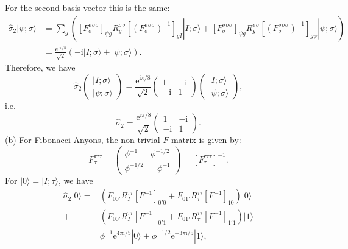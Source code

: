 For the second basis vector this is the same:
\begin{equation*}
\begin{aligned}
\hat{\sigma }_{2} |\psi ;\sigma \rangle  & =\sum _{g} ([F_{\sigma }^{\sigma \sigma \sigma } ]_{\psi g} R_{g}^{\sigma \sigma } [(F_{\sigma }^{\sigma \sigma \sigma } )^{-1} ]_{gI} |I;\sigma \rangle +[F_{\sigma }^{\sigma \sigma \sigma } ]_{\psi g} R_{g}^{\sigma \sigma } [(F_{\sigma }^{\sigma \sigma \sigma } )^{-1} ]_{g\psi } |\psi ;\sigma \rangle )\\
 & =\frac{\mathrm{e}^{\mathrm{i} \pi /8}}{\sqrt{2}} (-\mathrm{i} |I;\sigma \rangle +|\psi ;\sigma \rangle ).
\end{aligned}
\end{equation*}
Therefore, we have
\begin{equation*}
\hat{\sigma }_{2}\begin{pmatrix}
|I;\sigma \rangle \\
|\psi ;\sigma \rangle 
\end{pmatrix} =\frac{\mathrm{e}^{\mathrm{i} \pi /8}}{\sqrt{2}}\begin{pmatrix}
1 & -\mathrm{i}\\
-\mathrm{i} & 1
\end{pmatrix}\begin{pmatrix}
|I;\sigma \rangle \\
|\psi ;\sigma \rangle 
\end{pmatrix} ,
\end{equation*}
i.e.
\begin{equation*}
\hat{\sigma }_{2} =\frac{\mathrm{e}^{\mathrm{i} \pi /8}}{\sqrt{2}}\begin{pmatrix}
1 & -\mathrm{i}\\
-\mathrm{i} & 1
\end{pmatrix} .
\end{equation*}
(b) For Fibonacci Anyons, the non-trivial $F$ matrix is given by:
\begin{equation*}
F_{\tau }^{\tau \tau \tau } =\begin{pmatrix}
\phi ^{-1} & \phi ^{-1/2}\\
\phi ^{-1/2} & -\phi ^{-1}
\end{pmatrix} =[F_{\tau }^{\tau \tau \tau } ]^{-1} .
\end{equation*}
For $|0 \rangle =|I;\tau \rangle $, we have
\begin{equation*}
\begin{aligned}
\hat{\sigma }_{2} |0 \rangle = & (F_{00'} R_{I}^{\tau \tau } [F^{-1} ]_{0'0} +F_{01'} R_{\tau }^{\tau \tau } [F^{-1} ]_{10} )|0\rangle \\
+ & (F_{00'} R_{I}^{\tau \tau } [F^{-1} ]_{0'1} +F_{01'} R_{\tau }^{\tau \tau } [F^{-1} ]_{1'1} )|1\rangle \\
= & \phi ^{-1}\mathrm{e}^{4\pi \mathrm{i} /5} |0\rangle +\phi ^{-1/2}\mathrm{e}^{-3\pi \mathrm{i} /5} |1 \rangle ,
\end{aligned}
\end{equation*}
